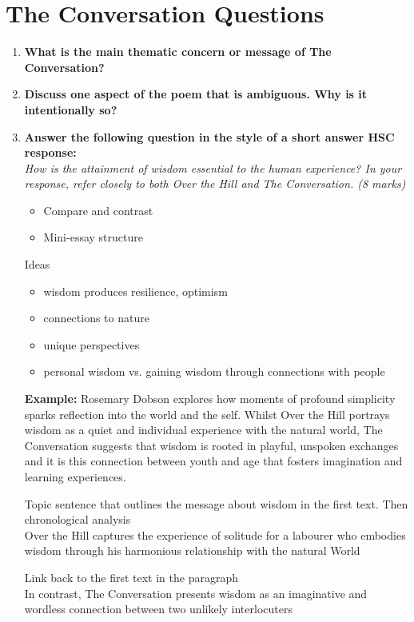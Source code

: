 \section{The Conversation Questions} \label{20/11/2024}
	\begin{enumerate}
		\item \textbf{What is the main thematic concern or message of The Conversation?}
		\item \textbf{Discuss one aspect of the poem that is ambiguous. Why is it intentionally so?}
		\item \textbf{Answer the following question in the style of a short answer HSC response:} \\
		\textit{How is the attainment of wisdom essential to the human experience? In your response, refer closely to both Over the Hill and The Conversation. (8 marks)}
		\begin{itemize}
			\item Compare and contrast
			\item Mini-essay structure
		\end{itemize}
		Ideas
		\begin{itemize}
			\item wisdom produces resilience, optimism
			\item connections to nature
			\item unique perspectives
			\item personal wisdom vs. gaining wisdom through connections with people
		\end{itemize}

		\subitem \textbf{Example:} Rosemary Dobson explores how moments of profound simplicity sparks reflection into the world and the self. Whilst Over the Hill portrays wisdom as a quiet and individual experience with the natural world, The Conversation suggests that wisdom is rooted in playful, unspoken exchanges and it is this connection between youth and age that fosters imagination and learning experiences.

		\subitem Topic sentence that outlines the message about wisdom in the first text. Then chronological analysis \\
			Over the Hill captures the experience of solitude for a labourer who embodies wisdom through his harmonious relationship with the natural World

		\subitem Link back to the first text in the paragraph \\
			In contrast, The Conversation presents wisdom as an imaginative and wordless connection between two unlikely interlocuters 
	\end{enumerate}

